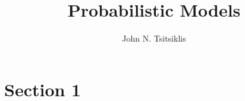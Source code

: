 \documentclass{tufte-handout}
\author{John N. Tsitsiklis}
\title{Probabilistic Models}
\theoremstyle{definition} \newtheorem{definition}{Definition}
\theoremstyle{definition} \newtheorem{remark}{Remark}
\theoremstyle{definition} \newtheorem{example}{Example}
\begin{document}
\maketitle
\section{Section 1}
\end{document}
